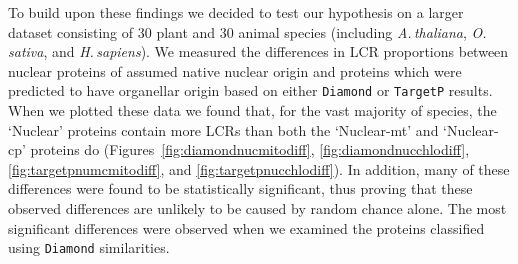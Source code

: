 \documentclass[a4paper,12pt]{article}
\newcommand{\ath}{\mbox{\textit{A.\,thaliana}}\xspace}
\newcommand{\osa}{\mbox{\textit{O.\,sativa}}\xspace}
\newcommand{\hsa}{\mbox{\textit{H.\,sapiens}}\xspace}
\newcommand{\tget}{\mbox{\texttt{TargetP}}\xspace}
\renewcommand{\diamond}{\mbox{\texttt{Diamond}}\xspace}
\begin{document}
\begin{multicols}{2}

To build upon these findings we decided to test our hypothesis on a
larger dataset consisting of 30 plant and 30 animal species
(including \ath, \osa, and \hsa). We measured the differences in LCR
proportions between nuclear proteins of assumed native nuclear
origin and proteins which were predicted to have organellar origin
based on either \diamond or \tget results. When we plotted these
data we found that, for the vast majority of species, the `Nuclear'
proteins contain more LCRs than both the `Nuclear-mt' and `Nuclear-cp'
proteins do (Figures~\ref{fig:diamondnucmitodiff},
\ref{fig:diamondnucchlodiff}, \ref{fig:targetpnumcmitodiff}, and
\ref{fig:targetpnucchlodiff}). In addition, many of these differences were found to be
statistically significant, thus proving that these observed
differences are unlikely to be caused by random chance alone. The
most significant differences were observed when we examined the proteins
classified using \diamond similarities.


\end{multicols}
\end{document}
